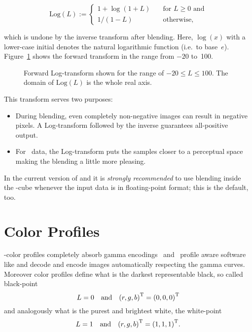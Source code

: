 \begin{equation}\label{equ:log-transform}
  \mbox{Log}(L) :=
  \left\{
  \begin{array}{ll}
    1 + \log(1 + L) & \quad \mbox{for } L \geq 0 \mbox{ and} \\
    1 / (1 - L)     & \quad \mbox{otherwise,}
  \end{array}
  \right.
\end{equation}

\noindent which is undone by the inverse transform after blending.
Here, $\log(x)$ with a lower-case initial denotes the natural
logarithmic function (i.e.\ to base~$e$).
Figure~\ref{fig:log-transform} shows the forward transform in the
range from $-20$ to~100.

\begin{figure}[htbp]
  \centering

  \caption[Log-transform]{Forward Log-transform shown for the range of
    $-20 \leq L \leq 100$.  The domain of $\mbox{Log}(L)$ is the whole
    real axis.\label{fig:log-transform}}

\end{figure}

This transform serves two purposes:
\begin{itemize}
\item
  During blending, even completely non-negative images can result in
  negative pixels.  A Log-transform followed by the inverse guarantees
  all-positive output.

\item
  For ~data, the Log-transform puts the samples closer to
  a perceptual space making the blending a little more pleasing.
\end{itemize}

In the current version of  and
 it is \emph{strongly recommended} to use blending
inside the -cube whenever the input data is in
floating-point format; this is the default, too.


\section[Color Profiles]{Color Profiles
  \label{sec:color-profiles}
  }

-color profiles completely absorb gamma
encodings~ and ~profile
aware software like  and 
decode and encode images automatically respecting the gamma curves.
Moreover color profiles define what is the darkest representable
black, so called black-point
\[
  L = 0
  \quad \mbox{and}\quad
  {(r, g, b)}^{\mathrm{T}} = {(0, 0, 0)}^{\mathrm{T}}
\]
and analogously what
is the purest and brightest white, the white-point
\[
  L = 1
  \quad \mbox{and}\quad
  {(r, g, b)}^{\mathrm{T}} = {(1, 1, 1)}^{\mathrm{T}}.
\]


